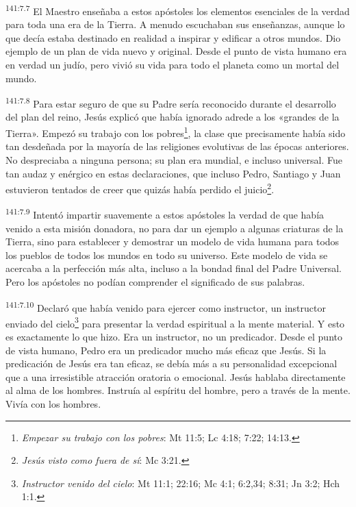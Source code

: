 \par
\textsuperscript{141:7.7} El Maestro enseñaba a estos apóstoles los elementos esenciales de la verdad para toda una era de la Tierra. A menudo escuchaban sus enseñanzas, aunque lo que decía estaba destinado en realidad a inspirar y edificar a otros mundos. Dio ejemplo de un plan de vida nuevo y original. Desde el punto de vista humano era en verdad un judío, pero vivió su vida para todo el planeta como un mortal del mundo.

\par
\textsuperscript{141:7.8} Para estar seguro de que su Padre sería reconocido durante el desarrollo del plan del reino, Jesús explicó que había ignorado adrede a los «grandes de la Tierra». Empezó su trabajo con los pobres\footnote{\textit{Empezar su trabajo con los pobres}: Mt 11:5; Lc 4:18; 7:22; 14:13.}, la clase que precisamente había sido tan desdeñada por la mayoría de las religiones evolutivas de las épocas anteriores. No despreciaba a ninguna persona; su plan era mundial, e incluso universal. Fue tan audaz y enérgico en estas declaraciones, que incluso Pedro, Santiago y Juan estuvieron tentados de creer que quizás había perdido el juicio\footnote{\textit{Jesús visto como fuera de sí}: Mc 3:21.}.

\par
\textsuperscript{141:7.9} Intentó impartir suavemente a estos apóstoles la verdad de que había venido a esta misión donadora, no para dar un ejemplo a algunas criaturas de la Tierra, sino para establecer y demostrar un modelo de vida humana para todos los pueblos de todos los mundos en todo su universo. Este modelo de vida se acercaba a la perfección más alta, incluso a la bondad final del Padre Universal. Pero los apóstoles no podían comprender el significado de sus palabras.

\par
\textsuperscript{141:7.10} Declaró que había venido para ejercer como instructor, un instructor enviado del cielo\footnote{\textit{Instructor venido del cielo}: Mt 11:1; 22:16; Mc 4:1; 6:2,34; 8:31; Jn 3:2; Hch 1:1.} para presentar la verdad espiritual a la mente material. Y esto es exactamente lo que hizo. Era un instructor, no un predicador. Desde el punto de vista humano, Pedro era un predicador mucho más eficaz que Jesús. Si la predicación de Jesús era tan eficaz, se debía más a su personalidad excepcional que a una irresistible atracción oratoria o emocional. Jesús hablaba directamente al alma de los hombres. Instruía al espíritu del hombre, pero a través de la mente. Vivía con los hombres.

